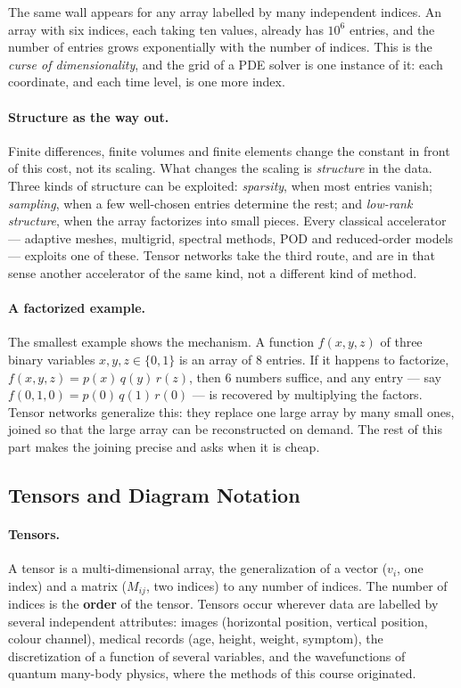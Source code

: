 The same wall appears for any array labelled by many independent indices. An
array with six indices, each taking ten values, already has $10^6$ entries, and
the number of entries grows exponentially with the number of indices. This is
the \emph{curse of dimensionality}, and the grid of a PDE solver is one instance
of it: each coordinate, and each time level, is one more index.

\paragraph{Structure as the way out.}
Finite differences, finite volumes and finite elements change the constant in
front of this cost, not its scaling. What changes the scaling is
\emph{structure} in the data. Three kinds of structure can be exploited:
\emph{sparsity}, when most entries vanish; \emph{sampling}, when a few
well-chosen entries determine the rest; and \emph{low-rank structure}, when the
array factorizes into small pieces. Every classical accelerator --- adaptive
meshes, multigrid, spectral methods, POD and reduced-order models --- exploits
one of these. Tensor networks take the third route, and are in that sense
another accelerator of the same kind, not a different kind of method.

\paragraph{A factorized example.}
The smallest example shows the mechanism. A function $f(x,y,z)$ of three binary
variables $x,y,z \in \{0,1\}$ is an array of $8$ entries. If it happens to
factorize, $f(x,y,z) = p(x)\,q(y)\,r(z)$, then $6$ numbers suffice, and any
entry --- say $f(0,1,0) = p(0)\,q(1)\,r(0)$ --- is recovered by multiplying the
factors. Tensor networks generalize this: they replace one large array by many
small ones, joined so that the large array can be reconstructed on demand. The
rest of this part makes the joining precise and asks when it is cheap.

\subsection{Tensors and Diagram Notation}
\label{subsec:penrose-notation}

\paragraph{Tensors.}
A tensor is a multi-dimensional array, the generalization of a vector ($v_i$,
one index) and a matrix ($M_{ij}$, two indices) to any number of indices. The
number of indices is the \textbf{order} of the tensor. Tensors occur wherever
data are labelled by several independent attributes: images (horizontal
position, vertical position, colour channel), medical records (age, height,
weight, symptom), the discretization of a function of several variables, and
the wavefunctions of quantum many-body physics, where the methods of this
course originated.

